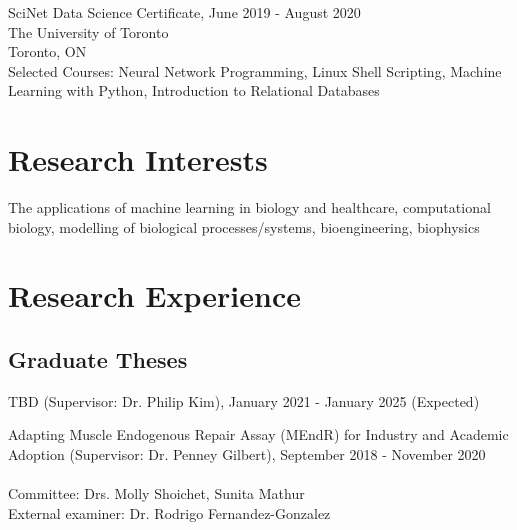 \documentclass[letterpaper]{article}
\renewenvironment{itemize}{
  \begin{list}{}{
    \setlength{\leftmargin}{1.5em}
  }
}{
  \end{list}
}
\begin{document}
\begin{itemize}
    \item SciNet Data Science Certificate, June 2019 - August 2020
    \\The University of Toronto
    \\Toronto, ON
    \\Selected Courses: Neural Network Programming, Linux Shell Scripting, Machine Learning with Python, Introduction to Relational Databases
\end{itemize}

\section*{\textbf{Research Interests}}
\begin{itemize}
\item The applications of machine learning in biology and healthcare, computational biology, modelling of biological processes/systems, bioengineering, biophysics
\end{itemize} 

\section*{\textbf{Research Experience}}

\subsection*{Graduate Theses}
\begin{itemize}
    
    \item TBD (Supervisor: Dr. Philip Kim), January 2021 - January 2025 (Expected)

    \item Adapting Muscle Endogenous Repair Assay (MEndR) for Industry and Academic Adoption (Supervisor: Dr. Penney Gilbert), September 2018 - November 2020 \\
    \\
    \tiny{Committee: Drs. Molly Shoichet, Sunita Mathur \\
           External examiner: Dr. Rodrigo Fernandez-Gonzalez}
\end{itemize}
\end{document}
